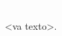 \cleardoublepage
\thispagestyle{empty}
{\textcolor{white}{.}}
\vspace{40mm}
\epigraph{<va texto>.}{}
\cleardoublepage

